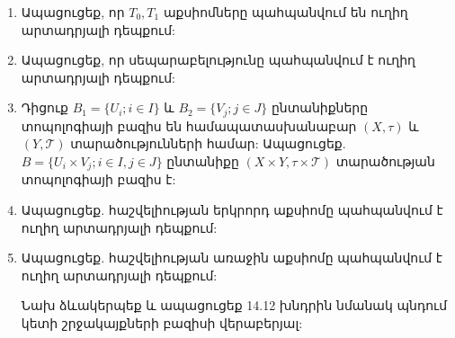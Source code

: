 \begin{enumerate}[label=\thesection.\arabic*., resume]

\item Ապացուցեք, որ $T_0, T_1$ աքսիոմները պահպանվում են ուղիղ արտադրյալի դեպքում:

\item Ապացուցեք, որ սեպարաբելությունը պահպանվում է ուղիղ արտադրյալի դեպքում:

\item Դիցուք $B_1=\{U_i; i \in I\}$ և $B_2=\{V_j; j \in J\}$ ընտանիքները տոպոլոգիայի բազիս են համապատասխանաբար $(X, \tau)$ և $(Y, \mathcal{T})$ տարածությունների համար: Ապացուցեք. $B=\{U_i \times V_j; i \in I, j \in J\}$ ընտանիքը $(X \times Y, \tau \times \mathcal{T})$ տարածության տոպոլոգիայի բազիս է:

\item Ապացուցեք. հաշվելիության երկրորդ աքսիոմը պահպանվում է ուղիղ արտադրյալի դեպքում:

\item Ապացուցեք. հաշվելիության առաջին աքսիոմը պահպանվում է ուղիղ արտադրյալի դեպքում:

\begin{hint}
Նախ ձևակերպեք և ապացուցեք 14.12 խնդրին նմանակ պնդում կետի շրջակայքների բազիսի վերաբերյալ:
\end{hint}

\end{enumerate}
